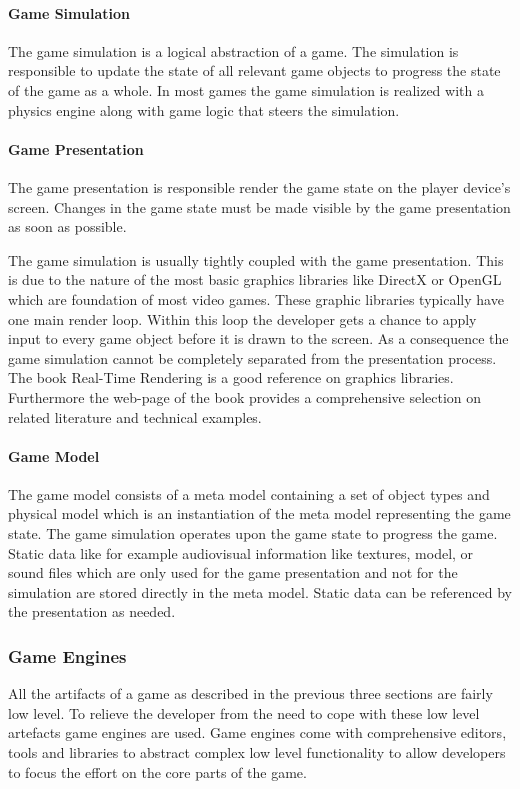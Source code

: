 \paragraph{Game Simulation}

The game simulation is a logical abstraction of a game. The simulation is
responsible to update the state of all relevant game objects to progress the
state of the game as a whole. In most games the game simulation is realized with
a physics engine along with game logic that steers the simulation.

\paragraph{Game Presentation}

The game presentation is responsible render the game state on the player
device's screen. Changes in the game state must be made visible by the game
presentation as soon as possible.

The game simulation is usually tightly coupled with the game presentation. This
is due to the nature of the most basic graphics libraries like DirectX or OpenGL
which are foundation of most video games. These graphic libraries typically have
one main render loop. Within this loop the developer gets a chance to apply
input to every game object before it is drawn to the screen. As a consequence
the game simulation cannot be completely separated from the presentation
process. The book Real-Time Rendering\cite{RTR3} is a good reference on graphics
libraries. Furthermore the web-page of the book provides a comprehensive
selection on related literature and technical examples.

\paragraph{Game Model}

The game model consists of a meta model containing a set of object types and
physical model which is an instantiation of the meta model representing the game
state. The game simulation operates upon the game state to progress the game.
Static data like for example audiovisual information like textures, model, or
sound files which are only used for the game presentation and not for the
simulation are stored directly in the meta model. Static data can be referenced
by the presentation as needed.

\subsubsection{Game Engines}
All the artifacts of a game as described in the previous three sections are
fairly low level. To relieve the developer from the need to cope with these low
level artefacts game engines are used. Game engines come with comprehensive
editors, tools and libraries to abstract complex low level functionality to
allow developers to focus the effort on the core parts of the game.

